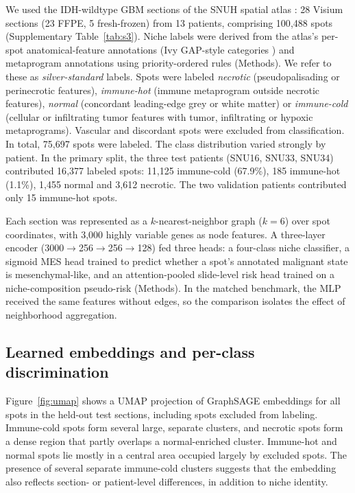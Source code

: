 \documentclass[11pt,letterpaper]{article}
\begin{document}
We used the IDH-wildtype GBM sections of the SNUH spatial atlas \cite{park2026}: 28 Visium sections (23 FFPE, 5 fresh-frozen) from 13 patients, comprising 100{,}488 spots (Supplementary Table~\ref{tab:s3}). Niche labels were derived from the atlas's per-spot anatomical-feature annotations (Ivy GAP-style categories \cite{puchalski2018}) and metaprogram annotations using priority-ordered rules (Methods). We refer to these as \emph{silver-standard} labels. Spots were labeled \emph{necrotic} (pseudopalisading or perinecrotic features), \emph{immune-hot} (immune metaprogram outside necrotic features), \emph{normal} (concordant leading-edge grey or white matter) or \emph{immune-cold} (cellular or infiltrating tumor features with tumor, infiltrating or hypoxic metaprograms). Vascular and discordant spots were excluded from classification. In total, 75{,}697 spots were labeled. The class distribution varied strongly by patient. In the primary split, the three test patients (SNU16, SNU33, SNU34) contributed 16{,}377 labeled spots: 11{,}125 immune-cold (67.9\%), 185 immune-hot (1.1\%), 1{,}455 normal and 3{,}612 necrotic. The two validation patients contributed only 15 immune-hot spots.

Each section was represented as a $k$-nearest-neighbor graph ($k = 6$) over spot coordinates, with 3{,}000 highly variable genes as node features. A three-layer encoder (3000$\rightarrow$256$\rightarrow$256$\rightarrow$128) fed three heads: a four-class niche classifier, a sigmoid MES head trained to predict whether a spot's annotated malignant state is mesenchymal-like, and an attention-pooled slide-level risk head trained on a niche-composition pseudo-risk (Methods). In the matched benchmark, the MLP received the same features without edges, so the comparison isolates the effect of neighborhood aggregation.

\subsection{Learned embeddings and per-class discrimination}

Figure~\ref{fig:umap} shows a UMAP \cite{mcinnes2018} projection of GraphSAGE embeddings for all spots in the held-out test sections, including spots excluded from labeling. Immune-cold spots form several large, separate clusters, and necrotic spots form a dense region that partly overlaps a normal-enriched cluster. Immune-hot and normal spots lie mostly in a central area occupied largely by excluded spots. The presence of several separate immune-cold clusters suggests that the embedding also reflects section- or patient-level differences, in addition to niche identity.
\end{document}
